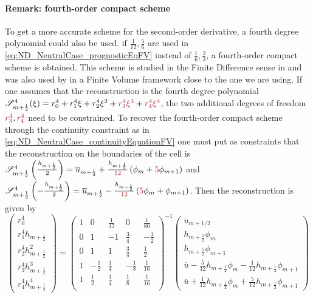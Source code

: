\paragraph{Remark: fourth-order compact scheme}
To get a more accurate scheme for the second-order derivative,
a fourth degree polynomial could also be used.
if $\frac{1}{12}, \frac{5}{6}$ are used in
\eqref{eq:ND_NeutralCase_prognosticEqFV} instead of
$\frac{1}{6}, \frac{2}{3}$, a fourth-order compact scheme
is obtained. This scheme is studied in the Finite Difference sense
in \citep{adam_highly_1977} and was also used
by \cite{piller_finite-volume_2004} in a Finite Volume framework
close to the one we are using.
If one assumes that the reconstruction is the fourth degree
polynomial
${\cal S}_{m+\frac{1}{2}}^4(\xi) = r_0^4 + r_1^4 \xi + r_2^4 \xi^2 
+ \emphase{r_3^4 \xi^3} + \emphase{r_4^4 \xi^4}$,
the two additional degrees of freedom $\emphase{r_3^4},
\emphase{r_4^4}$ need to be
constrained. To recover the fourth-order compact scheme through
the continuity constraint as in
\eqref{eq:ND_NeutralCase_continuityEquationFV}
one must put as constraints that the
reconstruction on the boundaries of the cell is
${\cal S}^4_{m+\frac{1}{2}}\left(\frac{h_{m+\frac{1}{2}}}{2}\right) =
\overline{u}_{m+\frac{1}{2}} +
\frac{h_{m+\frac{1}{2}}}{\emphase{12}}\left(
\phi_m + \emphase{5}\phi_{m+1}\right) $ and
${\cal S}^4_{m+\frac{1}{2}}\left(-\frac{h_{m+\frac{1}{2}}}{2}\right) =
\overline{u}_{m+\frac{1}{2}} -
\frac{h_{m+\frac{1}{2}}}{\emphase{12}}\left(
\emphase{5}\phi_m + \phi_{m+1}\right)$.
Then the reconstruction is given by
\begin{equation}
    \begin{pmatrix}
    r_0^4 \\
    r_1^4 h_{m+\frac{1}{2}} \\
    r_2^4 h_{m+\frac{1}{2}}^2 \\
    r_3^4 h_{m+\frac{1}{2}}^3 \\
    r_4^4 h_{m+\frac{1}{2}}^4
    \end{pmatrix}
     = 
    \begin{pmatrix}
    1 & 0 & \frac{1}{12} & 0 & \frac{1}{80} \\
    0 & 1 & -1 & \frac{3}{4} & -\frac{1}{2} \\
    0 & 1 & 1 & \frac{3}{4} & \frac{1}{2} \\
    1 & -\frac{1}{2} & \frac{1}{4} & -\frac{1}{8}
    & \frac{1}{16} \\
    1 & \frac{1}{2} & \frac{1}{4} & \frac{1}{8}
    & \frac{1}{16} \\
    \end{pmatrix}^{-1}
    \begin{pmatrix}
    \overline{u}_{m+1/2} \\
    h_{m+\frac{1}{2}} \phi_m \\
	    h_{m+\frac{1}{2}} \phi_{m+1} \\
	    \overline{u} - \frac{5}{12} h_{m+\frac{1}{2}} \phi_m
	    - \frac{1}{12} h_{m+\frac{1}{2}} \phi_{m+1} \\
	    \overline{u} + \frac{1}{12} h_{m+\frac{1}{2}} \phi_m
	    + \frac{5}{12} h_{m+\frac{1}{2}} \phi_{m+1}
    \end{pmatrix}
\end{equation}

